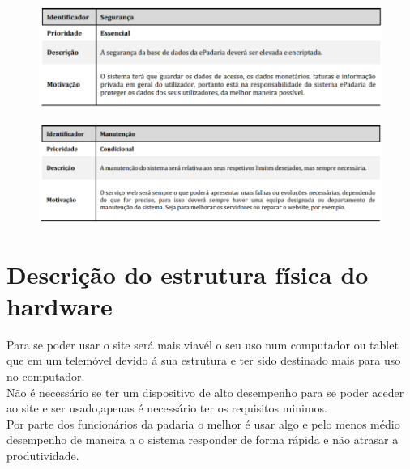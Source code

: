\begin{figure}[H]
	\centering
	\includegraphics{requisito_nao_funcional5}
	\caption{}
	\label{fig:requisitonaofuncional5}
\end{figure}

\begin{figure}[H]
	\centering
	\includegraphics{requisito_nao_funcional6}
	\caption{}
	\label{fig:requisitonaofuncional6}
\end{figure}

\section{Descrição do estrutura física do hardware}
Para se poder usar o site será mais viavél o seu uso num computador ou tablet que em um telemóvel devido á sua estrutura e ter sido destinado mais para uso no computador. \\
Não é necessário se ter um dispositivo de alto desempenho para se poder aceder ao site e ser usado,apenas é necessário ter os requisitos minimos.\\
Por parte dos funcionários da padaria o melhor é usar algo e pelo menos médio desempenho de maneira a o sistema responder de forma rápida e não atrasar a produtividade.

